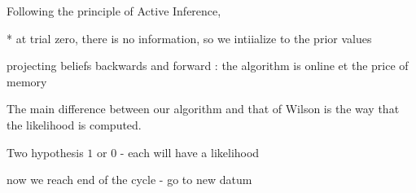 \documentclass[profile,final,english, draft]{article}%
\begin{document}
Following the principle of Active Inference, %

* at trial zero, there is no information, so we intiialize to the prior values


projecting beliefs backwards and forward  : the algorithm is online et the price of memory





The main difference between our algorithm and that of Wilson is the way that the likelihood is computed.


Two hypothesis $1$ or $0$ - each will have a likelihood




now we reach end of the cycle - go to new datum
\end{document}
